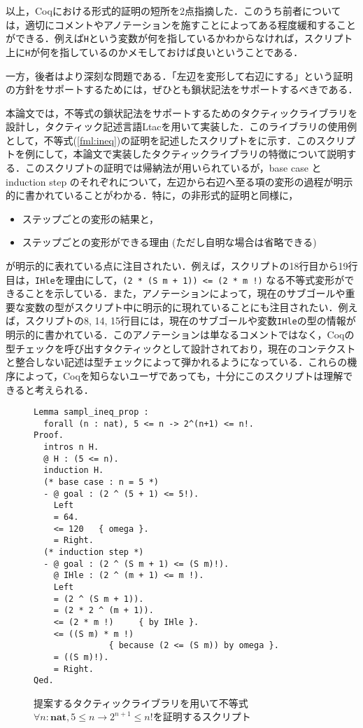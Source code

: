 \documentclass[submit]{ipsj}
\begin{document}
以上，Coqにおける形式的証明の短所を2点指摘した．このうち前者については，適切にコメントやアノテーションを施すことによってある程度緩和することができる．例えば\verb+H+という変数が何を指しているかわからなければ，スクリプト上に\verb+H+が何を指しているのかメモしておけば良いということである．

一方，後者はより深刻な問題である．「左辺を変形して右辺にする」という証明の方針をサポートするためには，ぜひとも鎖状記法をサポートするべきである．

本論文では，不等式の鎖状記法をサポートするためのタクティックライブラリを設計し，タクティック記述言語Ltacを用いて実装した．このライブラリの使用例として，不等式(\ref{fml:ineq})の証明を記述したスクリプトをに示す．このスクリプトを例にして，本論文で実装したタクティックライブラリの特徴について説明する．このスクリプトの証明では帰納法が用いられているが，base case と induction step のそれぞれについて，左辺から右辺へ至る項の変形の過程が明示的に書かれていることがわかる．特に，の非形式的証明と同様に，
\begin{itemize}
\item ステップごとの変形の結果と，
\item ステップごとの変形ができる理由 (ただし自明な場合は省略できる)
\end{itemize}
が明示的に表れている点に注目されたい．例えば，スクリプトの18行目から19行目は，\verb+IHle+を理由にして，\verb-(2 * (S m + 1)) <= (2 * m !)- なる不等式変形ができることを示している．また，アノテーションによって，現在のサブゴールや重要な変数の型がスクリプト中に明示的に現れていることにも注目されたい．例えば，スクリプトの8, 14, 15行目には，現在のサブゴールや変数\verb+IHle+の型の情報が明示的に書かれている．このアノテーションは単なるコメントではなく，Coqの型チェックを呼び出すタクティックとして設計されており，現在のコンテクストと整合しない記述は型チェックによって弾かれるようになっている．これらの機序によって，Coqを知らないユーザであっても，十分にこのスクリプトは理解できると考えられる．

\begin{figure}[t]
\begin{mdframed}
\begin{verbatim}
Lemma sampl_ineq_prop :
  forall (n : nat), 5 <= n -> 2^(n+1) <= n!.
Proof.
  intros n H.
  @ H : (5 <= n).
  induction H.
  (* base case : n = 5 *)
  - @ goal : (2 ^ (5 + 1) <= 5!).
    Left
    = 64.
    <= 120   { omega }.
    = Right.
  (* induction step *)
  - @ goal : (2 ^ (S m + 1) <= (S m)!).
    @ IHle : (2 ^ (m + 1) <= m !).
    Left
    = (2 ^ (S m + 1)).
    = (2 * 2 ^ (m + 1)).
    <= (2 * m !)     { by IHle }.
    <= ((S m) * m !) 
               { because (2 <= (S m)) by omega }.
    = ((S m)!).
    = Right.
Qed.
\end{verbatim}
\end{mdframed}
\caption{提案するタクティックライブラリを用いて不等式$\forall n : \mathbf{nat} \mathrel{,} 5 \leq n \to 2^{n + 1} \leq n!$を証明するスクリプト}
\label{fig:ex_proof_ineq}
\end{figure}
\end{document}

